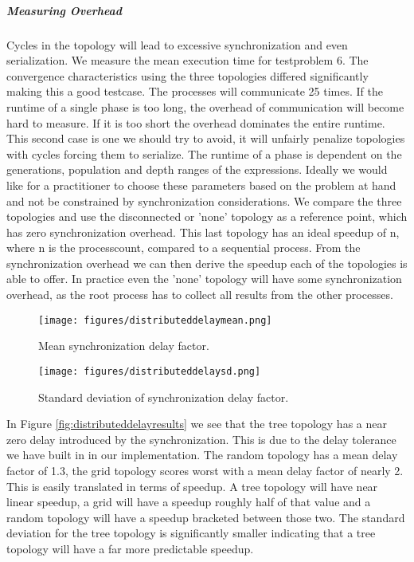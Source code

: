 \subparagraph{Measuring Overhead}
Cycles in the topology will lead to excessive synchronization and even serialization.
We measure the mean execution time for testproblem 6. The convergence characteristics using the three topologies differed significantly making this a good testcase. The processes will communicate 25 times. If the runtime of a single phase is too long, the overhead of communication will become hard to measure. If it is too short the overhead dominates the entire runtime. This second case is one we should try to avoid, it will unfairly penalize topologies with cycles forcing them to serialize. The runtime of a phase is dependent on the generations, population and depth ranges of the expressions. Ideally we would like for a practitioner to choose these parameters based on the problem at hand and not be constrained by synchronization considerations.
We compare the three topologies and use the disconnected or 'none' topology as a reference point, which has zero synchronization overhead.
This last topology has an ideal speedup of n, where n is the processcount, compared to a sequential process. From the synchronization overhead we can then derive the speedup each of the topologies is able to offer. In practice even the 'none' topology will have some synchronization overhead, as the root process has to collect all results from the other processes.
\begin{figure*}
    \centering
    \begin{subfigure}{0.5\textwidth}
    \centering
        \texttt{[image: figures/distributeddelaymean.png]}
        \caption{Mean synchronization delay factor.}
    \end{subfigure}%
    \begin{subfigure}{0.5\textwidth}
    \centering
        \texttt{[image: figures/distributeddelaysd.png]}
        \caption{Standard deviation of synchronization delay factor.}
    \end{subfigure}
    \caption{Synchronization overhead introduced by topologies.}
    \label{fig:distributeddelayresults}
    \end{figure*}
In Figure \ref{fig:distributeddelayresults} we see that the tree topology has a near zero delay introduced by the synchronization. This is due to the delay tolerance we have built in in our implementation. The random topology has a mean delay factor of 1.3, the grid topology scores worst with a mean delay factor of nearly 2. This is easily translated in terms of speedup. A tree topology will have near linear speedup, a grid will have a speedup roughly half of that value and a random topology will have a speedup bracketed between those two. The standard deviation for the tree topology is significantly smaller indicating that a tree topology will have a far more predictable speedup.
